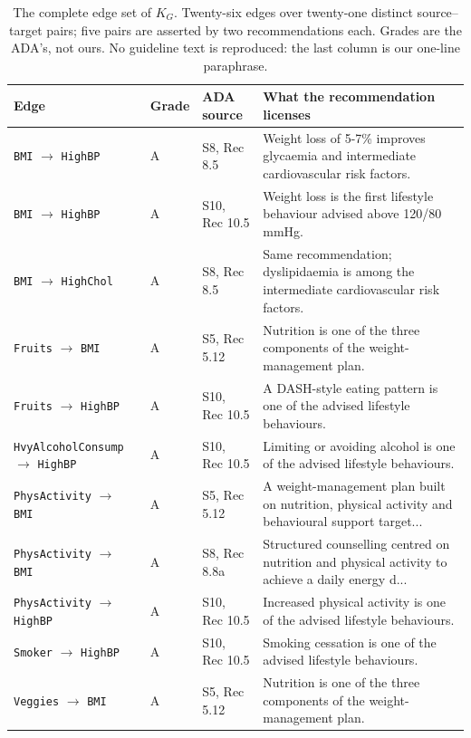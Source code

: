 \documentclass[conference]{IEEEtran}
\begin{document}
\begin{table}[t]
\caption{The complete edge set of $K_G$. Twenty-six edges over twenty-one distinct source--target pairs; five pairs are asserted by two recommendations each. Grades are the ADA's, not ours. No guideline text is reproduced: the last column is our one-line paraphrase.}
\label{tab:edges-full}
\centering\scriptsize
\begin{tabular}{@{}lllp{9.2cm}@{}}
\toprule
\textbf{Edge} & \textbf{Grade} & \textbf{ADA source} & \textbf{What the recommendation licenses} \\
\midrule
\texttt{BMI} $\rightarrow$ \texttt{HighBP} & A & S8, Rec 8.5 & Weight loss of 5-7\% improves glycaemia and intermediate cardiovascular risk factors. \\
\texttt{BMI} $\rightarrow$ \texttt{HighBP} & A & S10, Rec 10.5 & Weight loss is the first lifestyle behaviour advised above 120/80 mmHg. \\
\texttt{BMI} $\rightarrow$ \texttt{HighChol} & A & S8, Rec 8.5 & Same recommendation; dyslipidaemia is among the intermediate cardiovascular risk factors. \\
\texttt{Fruits} $\rightarrow$ \texttt{BMI} & A & S5, Rec 5.12 & Nutrition is one of the three components of the weight-management plan. \\
\texttt{Fruits} $\rightarrow$ \texttt{HighBP} & A & S10, Rec 10.5 & A DASH-style eating pattern is one of the advised lifestyle behaviours. \\
\texttt{HvyAlcoholConsump} $\rightarrow$ \texttt{HighBP} & A & S10, Rec 10.5 & Limiting or avoiding alcohol is one of the advised lifestyle behaviours. \\
\texttt{PhysActivity} $\rightarrow$ \texttt{BMI} & A & S5, Rec 5.12 & A weight-management plan built on nutrition, physical activity and behavioural support target... \\
\texttt{PhysActivity} $\rightarrow$ \texttt{BMI} & A & S8, Rec 8.8a & Structured counselling centred on nutrition and physical activity to achieve a daily energy d... \\
\texttt{PhysActivity} $\rightarrow$ \texttt{HighBP} & A & S10, Rec 10.5 & Increased physical activity is one of the advised lifestyle behaviours. \\
\texttt{Smoker} $\rightarrow$ \texttt{HighBP} & A & S10, Rec 10.5 & Smoking cessation is one of the advised lifestyle behaviours. \\
\texttt{Veggies} $\rightarrow$ \texttt{BMI} & A & S5, Rec 5.12 & Nutrition is one of the three components of the weight-management plan. \\

\end{tabular}
\end{table}
\end{document}
